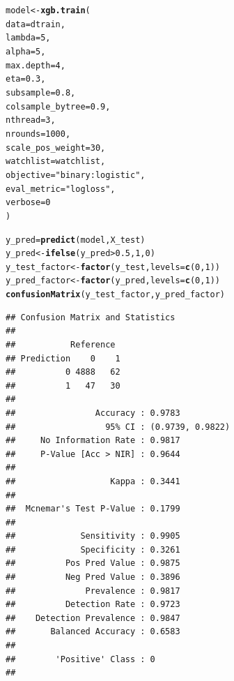 \documentclass{article}\usepackage[]{graphicx}\usepackage[]{xcolor}
\makeatletter
\newcommand{\hlnum}[1]{\textcolor[rgb]{0.686,0.059,0.569}{#1}}%
\newcommand{\hlsng}[1]{\textcolor[rgb]{0.192,0.494,0.8}{#1}}%
\newcommand{\hlopt}[1]{\textcolor[rgb]{0,0,0}{#1}}%
\newcommand{\hldef}[1]{\textcolor[rgb]{0.345,0.345,0.345}{#1}}%
\newcommand{\hlkwb}[1]{\textcolor[rgb]{0.69,0.353,0.396}{#1}}%
\newcommand{\hlkwc}[1]{\textcolor[rgb]{0.333,0.667,0.333}{#1}}%
\newcommand{\hlkwd}[1]{\textcolor[rgb]{0.737,0.353,0.396}{\textbf{#1}}}%
\newenvironment{kframe}{%
 \def\at@end@of@kframe{}%
 \ifinner\ifhmode%
  \def\at@end@of@kframe{\end{minipage}}%
  \begin{minipage}{\columnwidth}%
 \fi\fi%
 \def\FrameCommand##1{\hskip\@totalleftmargin \hskip-\fboxsep
 \colorbox{shadecolor}{##1}\hskip-\fboxsep
     \hskip-\linewidth \hskip-\@totalleftmargin \hskip\columnwidth}%
 \MakeFramed {\advance\hsize-\width
   \@totalleftmargin\z@ \linewidth\hsize
   \@setminipage}}%
 {\par\unskip\endMakeFramed%
 \at@end@of@kframe}
\newenvironment{knitrout}{}{} %
\makeatother
\begin{document}
\begin{knitrout}
\color{fgcolor}\begin{kframe}
\begin{alltt}
\hldef{model} \hlkwb{<-} \hlkwd{xgb.train}\hldef{(}
  \hlkwc{data}\hldef{=dtrain,}
  \hlkwc{lambda} \hldef{=} \hlnum{5}\hldef{,}
  \hlkwc{alpha}\hldef{=}\hlnum{5}\hldef{,}
  \hlkwc{max.depth}\hldef{=}\hlnum{4}\hldef{,}
  \hlkwc{eta}\hldef{=}\hlnum{0.3}\hldef{,}
  \hlkwc{subsample}\hldef{=}\hlnum{0.8}\hldef{,}
  \hlkwc{colsample_bytree}\hldef{=}\hlnum{0.9}\hldef{,}
  \hlkwc{nthread} \hldef{=} \hlnum{3}\hldef{,}
  \hlkwc{nrounds}\hldef{=}\hlnum{1000}\hldef{,}
  \hlkwc{scale_pos_weight} \hldef{=} \hlnum{30}\hldef{,}
  \hlkwc{watchlist}\hldef{=watchlist,}
  \hlkwc{objective} \hldef{=} \hlsng{"binary:logistic"}\hldef{,}
  \hlkwc{eval_metric} \hldef{=} \hlsng{"logloss"}\hldef{,}
  \hlkwc{verbose} \hldef{=} \hlnum{0}
\hldef{)}

\hldef{y_pred} \hlkwb{=} \hlkwd{predict}\hldef{(model, X_test)}
\hldef{y_pred} \hlkwb{<-} \hlkwd{ifelse}\hldef{(y_pred} \hlopt{>} \hlnum{0.5}\hldef{,} \hlnum{1}\hldef{,} \hlnum{0}\hldef{)}
\hldef{y_test_factor} \hlkwb{<-} \hlkwd{factor}\hldef{(y_test,} \hlkwc{levels} \hldef{=} \hlkwd{c}\hldef{(}\hlnum{0}\hldef{,} \hlnum{1}\hldef{))}
\hldef{y_pred_factor} \hlkwb{<-} \hlkwd{factor}\hldef{(y_pred,} \hlkwc{levels} \hldef{=} \hlkwd{c}\hldef{(}\hlnum{0}\hldef{,} \hlnum{1}\hldef{))}
\hlkwd{confusionMatrix}\hldef{(y_test_factor, y_pred_factor)}
\end{alltt}
\begin{verbatim}
## Confusion Matrix and Statistics
## 
##           Reference
## Prediction    0    1
##          0 4888   62
##          1   47   30
##                                           
##                Accuracy : 0.9783          
##                  95% CI : (0.9739, 0.9822)
##     No Information Rate : 0.9817          
##     P-Value [Acc > NIR] : 0.9644          
##                                           
##                   Kappa : 0.3441          
##                                           
##  Mcnemar's Test P-Value : 0.1799          
##                                           
##             Sensitivity : 0.9905          
##             Specificity : 0.3261          
##          Pos Pred Value : 0.9875          
##          Neg Pred Value : 0.3896          
##              Prevalence : 0.9817          
##          Detection Rate : 0.9723          
##    Detection Prevalence : 0.9847          
##       Balanced Accuracy : 0.6583          
##                                           
##        'Positive' Class : 0               
## 
\end{verbatim}
\end{kframe}
\end{knitrout}
\end{document}
